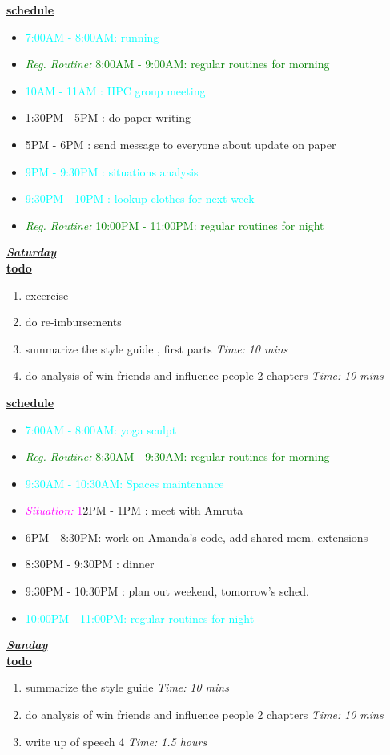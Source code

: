 \documentclass[11pt]{article}
\newcommand{\timeEst}[1]{\textit{Time:} \textit{#1}}
\newcommand{\regItem}[1]{\item \textcolor{cyan}{#1}}
\newcommand{\regRoutineItem}[1]{\item \textcolor{green}{\textit{Reg. Routine:} #1}}
\newcommand{\situationItem}[1]{\item \textcolor{magenta}{\textit{Situation:} #1}}
\begin{document}
\underline{\textbf{schedule}}\\
\begin{itemize}
\regItem{7:00AM - 8:00AM: running}
\regRoutineItem {8:00AM - 9:00AM: regular routines for morning}
\regItem{10AM - 11AM : HPC group meeting}
\item 1:30PM - 5PM :  do paper writing
\item 5PM - 6PM : send message to everyone about update on paper
\regItem{9PM - 9:30PM :  situations analysis}
\regItem{9:30PM - 10PM :  lookup clothes for next week}
\regRoutineItem{10:00PM - 11:00PM: regular routines for night}
\end{itemize}

\underline{\textbf{\textit{Saturday}}}\\
\underline{\textbf{todo}}\\
\begin{enumerate}
\item excercise
\item do re-imbursements
\item summarize the style guide , first parts \timeEst{10 mins}
\item do analysis of win friends and influence people 2 chapters \timeEst{10 mins}

\end{enumerate}

\underline{\textbf{schedule}}\\
\begin{itemize}
\regItem{7:00AM - 8:00AM: yoga sculpt}
\regRoutineItem {8:30AM - 9:30AM: regular routines for morning}
\regItem{9:30AM - 10:30AM: Spaces maintenance}
\situationItem 12PM - 1PM :  meet with Amruta
\item 6PM - 8:30PM: work on Amanda's code, add shared mem. extensions
\item 8:30PM - 9:30PM : dinner
\item 9:30PM - 10:30PM : plan out weekend, tomorrow's sched.
\regItem{10:00PM - 11:00PM: regular routines for night}
\end{itemize}

\underline{\textbf{\textit{Sunday}}}\\
\underline{\textbf{todo}}\\
\begin{enumerate}
\item summarize the style guide \timeEst{10 mins}
\item do analysis of win friends and influence people 2 chapters \timeEst{10 mins}
\item  write up of speech 4 \timeEst{1.5 hours}
\end{enumerate}
\end{document}
